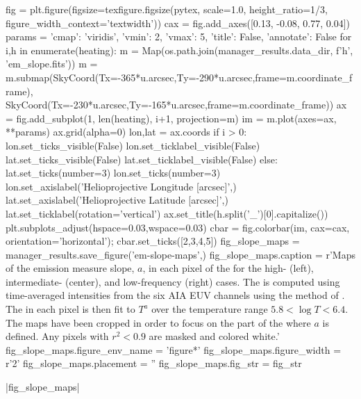 \begin{pycode}
fig = plt.figure(figsize=texfigure.figsize(pytex, scale=1.0, height_ratio=1/3,
                                           figure_width_context='textwidth'))
cax = fig.add_axes([0.13, -0.08, 0.77, 0.04])
params = {'cmap': 'viridis', 'vmin': 2, 'vmax': 5, 'title': False, 'annotate': False}
for i,h in enumerate(heating):
    m = Map(os.path.join(manager_results.data_dir, f'{h}', 'em_slope.fits'))
    m = m.submap(SkyCoord(Tx=-365*u.arcsec,Ty=-290*u.arcsec,frame=m.coordinate_frame),
                 SkyCoord(Tx=-230*u.arcsec,Ty=-165*u.arcsec,frame=m.coordinate_frame))
    ax = fig.add_subplot(1, len(heating), i+1, projection=m)
    im = m.plot(axes=ax, **params)
    ax.grid(alpha=0)
    lon,lat = ax.coords
    if i > 0:
        lon.set_ticks_visible(False)
        lon.set_ticklabel_visible(False)
        lat.set_ticks_visible(False)
        lat.set_ticklabel_visible(False)
    else:
        lat.set_ticks(number=3)
        lon.set_ticks(number=3)
        lon.set_axislabel('Helioprojective Longitude [arcsec]',)
        lat.set_axislabel('Helioprojective Latitude [arcsec]',)
        lat.set_ticklabel(rotation='vertical')
    ax.set_title(h.split('_')[0].capitalize())
plt.subplots_adjust(hspace=0.03,wspace=0.03)
cbar = fig.colorbar(im, cax=cax, orientation='horizontal');
cbar.set_ticks([2,3,4,5])
fig_slope_maps = manager_results.save_figure('em-slope-maps',)
fig_slope_maps.caption = r'Maps of the emission measure slope, $a$, in each pixel of the \AR{} for the high- (left), intermediate- (center), and low-frequency (right) cases. The \dem{} is computed using time-averaged intensities from the six AIA EUV channels using the method of \citet{hannah_differential_2012}. The \dem{} in each pixel is then fit to $T^a$ over the temperature range $5.8<\log{T}<6.4$. The maps have been cropped in order to focus on the part of the \AR{} where $a$ is defined. Any pixels with $r^2<0.9$ are masked and colored white.'
fig_slope_maps.figure_env_name = 'figure*'
fig_slope_maps.figure_width = r'2\columnwidth'
fig_slope_maps.placement = ''
fig_slope_maps.fig_str = fig_str
\end{pycode}
|fig_slope_maps|


